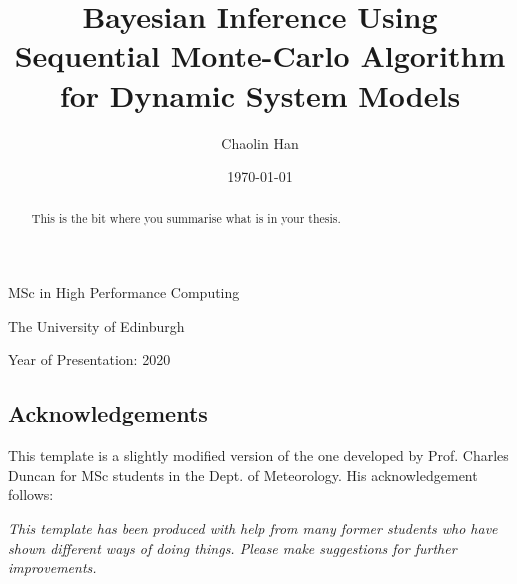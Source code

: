 \documentclass[12pt,a4paper]{report}
\begin{document}




\title{Bayesian Inference Using Sequential Monte-Carlo Algorithm for Dynamic System Models}
\author{Chaolin Han}
\date{\today}

\makeEPCCtitle

\thispagestyle{empty}

\vspace{11cm}

\begin{center}

\large{MSc in High Performance Computing}

\large{The University of Edinburgh}

\large{Year of Presentation: 2020}

\end{center}

\newpage

\begin{abstract}
This is the bit where you summarise what is in your thesis.
\end{abstract}


\tableofcontents
\listoftables
\listoffigures

\begin{titlepage}
\vspace*{2in}
\section*{Acknowledgements}

This template is a slightly modified version of the one developed by
Prof. Charles Duncan for MSc students in the Dept. of Meteorology. His
acknowledgement follows:

{\em This template has been produced with help from many former students who
have shown different ways of doing things. Please make suggestions for
further improvements.}

\end{titlepage}
\end{document}
